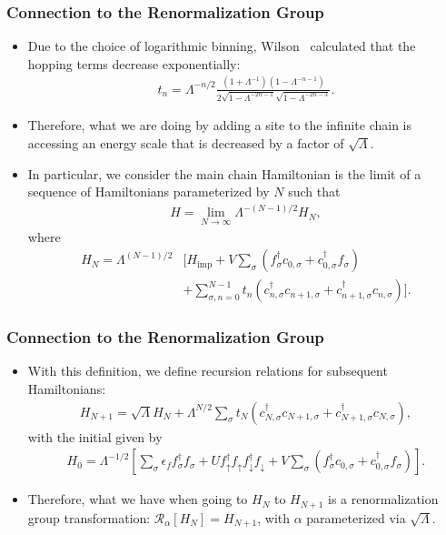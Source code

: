 \documentclass{beamer}
\begin{document}
\begin{frame}
  \frametitle{Connection to the Renormalization Group}

  \begin{itemize}
  \item Due to the choice of logarithmic binning, Wilson~\cite{Wilson_1975} calculated that the hopping terms decrease exponentially:
    \begin{gather*}
      t_n = \Lambda^{-n/2}\frac{(1 + \Lambda^{-1})(1 - \Lambda^{-n-1})}{2\sqrt{1 - \Lambda^{-2n-1}}\sqrt{1 - \Lambda^{-2n-3}}}.
    \end{gather*}
  \item Therefore, what we are doing by adding a site to the infinite chain is accessing an energy scale that is decreased by a factor of $\sqrt{\Lambda}$.
  \item In particular, we consider the main chain Hamiltonian is the limit of a sequence of Hamiltonians parameterized by $N$ such that
    \begin{gather*}
      H = \lim_{N\rightarrow\infty} \Lambda^{-(N-1)/2}H_N,
    \end{gather*}
    where
    \begin{align*}
      H_N = \Lambda^{(N-1)/2} &\big[ H_{\mathrm{imp}} + V\sum_\sigma (f^\dagger_\sigma c_{0,\sigma} + c^\dagger_{0,\sigma}f_\sigma)\\
                              &+ \sum_{\sigma,n=0}^{N-1} t_n(c^\dagger_{n,\sigma}c_{n+1,\sigma} + c^\dagger_{n+1,\sigma}c_{n,\sigma}) \big].
    \end{align*}
  \end{itemize}
\end{frame}

\begin{frame}
  \frametitle{Connection to the Renormalization Group}

  \begin{itemize}
  \item With this definition, we define recursion relations for subsequent Hamiltonians:
    \begin{gather*}
      H_{N+1} = \sqrt{\Lambda}H_N + \Lambda^{N/2}\sum_\sigma t_N (c^\dagger_{N,\sigma}c_{N+1,\sigma} + c^\dagger_{N+1,\sigma}c_{N,\sigma}),
    \end{gather*}
    with the initial given by
    \begin{gather*}
      H_0 = \Lambda^{-1/2}\left[ \sum_\sigma \epsilon_f f^\dagger_\sigma f_\sigma + Uf^\dagger_\uparrow f_\uparrow f^\dagger_\downarrow f_\downarrow + V\sum_\sigma (f^\dagger_\sigma c_{0,\sigma} + c^\dagger_{0,\sigma}f_\sigma) \right].
    \end{gather*}
  \item Therefore, what we have when going to $H_N$ to $H_{N+1}$ is a renormalization group transformation: $\mathcal{R}_\alpha[H_{N}] = H_{N+1}$, with $\alpha$ parameterized via $\sqrt{\Lambda}$.
  \end{itemize}
\end{frame}
\end{document}
